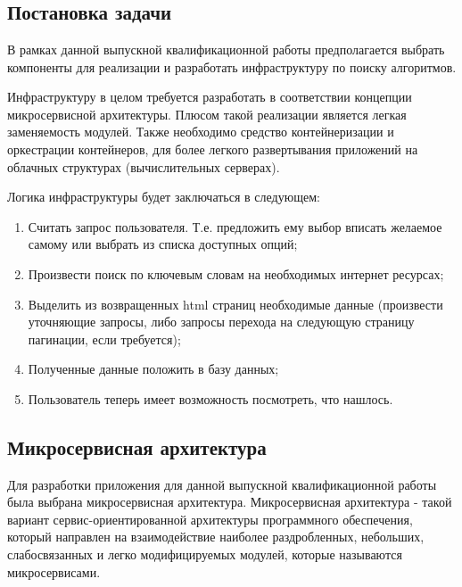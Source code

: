 
\chapter{\centering{}}
\label{cha:ch_1}

\section{Постановка задачи}
В рамках данной выпускной квалификационной работы предполагается выбрать
компоненты для реализации и разработать инфраструктуру по поиску алгоритмов.

Инфраструктуру в целом требуется разработать в соответствии концепции
микросервисной архитектуры. Плюсом такой реализации является легкая заменяемость
модулей. Также необходимо средство контейнеризации и оркестрации контейнеров,
для более легкого развертывания приложений на облачных структурах
(вычислительных серверах).

Логика инфраструктуры будет заключаться в следующем:
\begin{enumerate}[label=\arabic*.]
    \item Считать запрос пользователя. Т.е. предложить ему выбор вписать желаемое самому или выбрать из списка доступных опций;
    \item Произвести поиск по ключевым словам на необходимых интернет ресурсах;
    \item Выделить из возвращенных html страниц необходимые данные (произвести уточняющие запросы, либо запросы перехода на следующую страницу пагинации, если требуется);
    \item Полученные данные положить в базу данных;
    \item Пользователь теперь имеет возможность посмотреть, что нашлось.
\end{enumerate}

\section{Микросервисная архитектура}
Для разработки приложения для данной выпускной квалификационной работы была выбрана микросервисная архитектура.
Микросервисная архитектура - такой вариант сервис-ориентированной архитектуры
программного обеспечения, который направлен на взаимодействие наиболее
раздробленных, небольших, слабосвязанных и легко модифицируемых модулей, которые
называются микросервисами.

